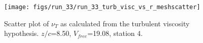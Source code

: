 \begin{figure}[H]
\centering
\texttt{[image: figs/run\_33/run\_33\_turb\_visc\_vs\_r\_meshscatter]}
\caption{Scatter plot of $\nu_T$ as calculated from the turbulent viscosity hypothesis. $z/c$=8.50, $V_{free}$=19.08, station 4.}
\label{fig:run_33_turb_visc_vs_r_meshscatter}
\end{figure}


